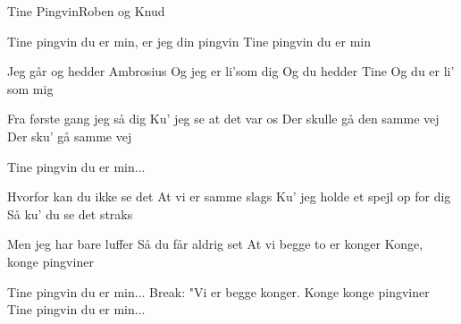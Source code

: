 \begin{sang}{Tine Pingvin}{Roben og Knud}

\begin{omkvaed}
Tine pingvin du er min, er jeg din pingvin
Tine pingvin du er min
\end{omkvaed}

\begin{vers}
Jeg går og hedder Ambrosius
Og jeg er li'som dig
Og du hedder Tine
Og du er li' som mig
\end{vers} 

\begin{vers}
Fra første gang jeg så dig
Ku' jeg se at det var os
Der skulle gå den samme vej
Der sku' gå samme vej 
\end{vers}
\vspace{-0.5cm}
\begin{omkvaed}
Tine pingvin du er min... 
\end{omkvaed}
\begin{vers}
Hvorfor kan du ikke se det
At vi er samme slags
Ku' jeg holde et spejl op for dig
Så ku' du se det straks
\end{vers}
\begin{vers}
Men jeg har bare luffer
Så du får aldrig set
At vi begge to er konger
Konge, konge pingviner  
\end{vers}
\begin{omkvaed}
Tine pingvin du er min...
Break: "Vi er begge konger. Konge konge
pingviner
Tine pingvin du er min... 
\end{omkvaed}
\end{sang}